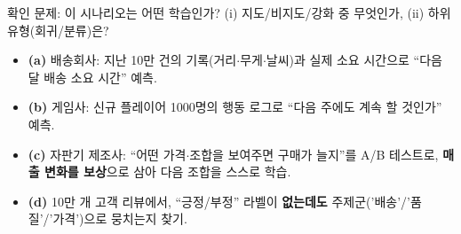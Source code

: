 \begin{frame}{확인 문제: 이 시나리오는 어떤 학습인가?}
  (i) 지도/비지도/강화 중 무엇인가, (ii) 하위 유형(회귀/분류)은?
  \small
  \begin{itemize}
    \item \textbf{(a)} 배송회사: 지난 10만 건의 기록(거리$\cdot$무게$\cdot$날씨)과
      실제 소요 시간으로 ``다음 달 배송 소요 시간'' 예측.
    \item \textbf{(b)} 게임사: 신규 플레이어 1000명의 행동 로그로
      ``다음 주에도 계속 할 것인가'' 예측.
    \item \textbf{(c)} 자판기 제조사: ``어떤 가격$\cdot$조합을 보여주면
      구매가 늘지''를 A/B 테스트로, \textbf{매출 변화를 보상}으로 삼아
      다음 조합을 스스로 학습.
    \item \textbf{(d)} 10만 개 고객 리뷰에서, ``긍정/부정'' 라벨이
      \textbf{없는데도} 주제군('배송'/'품질'/'가격')으로 뭉치는지 찾기.
  \end{itemize}
\end{frame}
